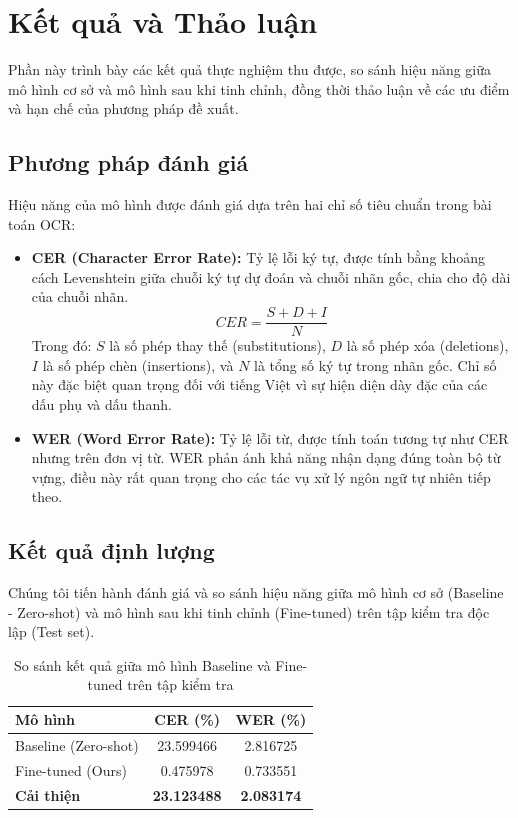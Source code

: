 \section{Kết quả và Thảo luận}

Phần này trình bày các kết quả thực nghiệm thu được, so sánh hiệu năng giữa mô hình cơ sở và mô hình sau khi tinh chỉnh, đồng thời thảo luận về các ưu điểm và hạn chế của phương pháp đề xuất.

\subsection{Phương pháp đánh giá}

Hiệu năng của mô hình được đánh giá dựa trên hai chỉ số tiêu chuẩn trong bài toán OCR:

\begin{itemize}
    \item \textbf{CER (Character Error Rate):} Tỷ lệ lỗi ký tự, được tính bằng khoảng cách Levenshtein giữa chuỗi ký tự dự đoán và chuỗi nhãn gốc, chia cho độ dài của chuỗi nhãn.
    \begin{equation}
        CER = \frac{S + D + I}{N}
    \end{equation}
    Trong đó: $S$ là số phép thay thế (substitutions), $D$ là số phép xóa (deletions), $I$ là số phép chèn (insertions), và $N$ là tổng số ký tự trong nhãn gốc. Chỉ số này đặc biệt quan trọng đối với tiếng Việt vì sự hiện diện dày đặc của các dấu phụ và dấu thanh.

    \item \textbf{WER (Word Error Rate):} Tỷ lệ lỗi từ, được tính toán tương tự như CER nhưng trên đơn vị từ. WER phản ánh khả năng nhận dạng đúng toàn bộ từ vựng, điều này rất quan trọng cho các tác vụ xử lý ngôn ngữ tự nhiên tiếp theo.
\end{itemize}

\subsection{Kết quả định lượng}

Chúng tôi tiến hành đánh giá và so sánh hiệu năng giữa mô hình cơ sở (Baseline - Zero-shot) và mô hình sau khi tinh chỉnh (Fine-tuned) trên tập kiểm tra độc lập (Test set).

\begin{table}[H]
\centering
\caption{So sánh kết quả giữa mô hình Baseline và Fine-tuned trên tập kiểm tra}
\begin{tabular}{|l|c|c|}
\hline
\textbf{Mô hình} & \textbf{CER (\%)} & \textbf{WER (\%)} \\
\hline
Baseline (Zero-shot) & 23.599466 & 2.816725 \\
\hline
Fine-tuned (Ours) & 0.475978 & 0.733551 \\
\hline
\textbf{Cải thiện} & \textbf{23.123488} & \textbf{2.083174} \\
\hline
\end{tabular}
\end{table}

